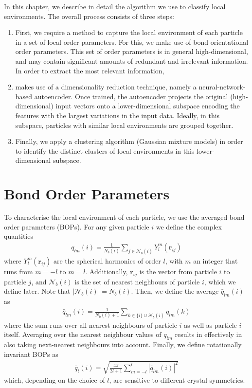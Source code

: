 \documentclass{report}
\begin{document}
In this chapter, we describe in detail the algorithm we use to classify local environments. The overall process consists of three steps:
\begin{enumerate}
	\item First, we require a method to capture the local environment of each particle in a set of local order parameters. For this, we make use of bond orientational order parameters. This set of order parameters is in general high-dimensional, and may contain significant amounts of redundant and irrelevant information. In order to extract the most relevant information,
	\item makes use of a dimensionality reduction technique, namely a neural-network-based autoencoder. Once trained, the autoencoder projects the original (high-dimensional) input vectors onto a lower-dimensional subspace encoding the features with the largest variations in the input data. Ideally, in this subspace, particles with similar local environments are grouped together.
	\item Finally, we apply a clustering algorithm (Gaussian mixture models) in order to identify the distinct clusters of local environments in this lower-dimensional subspace.
\end{enumerate}

\section{Bond Order Parameters}

	To characterise the local environment of each particle, we use the averaged bond order parameters (BOPs). For any given particle $i$ we define the complex quantities
	\begin{align}
		q_{lm}(i)=\frac1{N_b(i)}\sum_{j\in\mathcal{N}_b(i)}Y_l^m(\bm{r}_{ij})
	\end{align}
	where $Y_l^m(\bm{r}_{ij})$ are the spherical harmonics of order $l$, with $m$ an integer that runs from $m=-l$ to $m=l$. Additionally, $\bm{r}_{ij}$ is the vector from particle $i$ to particle $j$, and $\mathcal{N}_b(i)$ is the set of nearest neighbours of particle $i$, which we define later. Note that $|\mathcal{N}_b(i)|=N_b(i)$. Then, we define the average $\bar q_{lm}(i)$ as
	\begin{align}
		\bar q_{lm}(i)=\frac1{N_b(i)+1}\sum_{k\in\{i\}\cup\mathcal{N}_b(i)}q_{lm}(k)
	\end{align}
	where the sum runs over all nearest neighbours of particle $i$ as well as particle $i$ itself. Averaging over the nearest neighbour values of $q_{lm}$ results in effectively in also taking next-nearest neighbours into account. Finally, we define rotationally invariant BOPs as
	\begin{align}
		\bar q_l(i)=\sqrt{
		\frac{4\pi}{2l+1}
		\sum_{m=-l}^l|\bar q_{lm}(i)|^2
		}
	\end{align}
	which, depending on the choice of $l$, are sensitive to different crystal symmetries.
	
\end{document}
